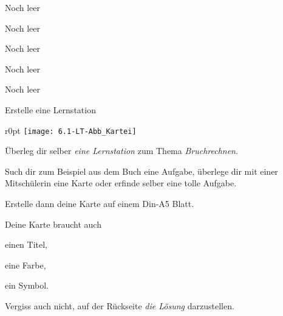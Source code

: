 \documentclass[12pt,a5paper,landscape]{scrartcl}
\begin{document}
	\begin{karte1}{Noch leer}
	\end{karte1}
	
	\begin{karte1}{Noch leer}
	\end{karte1}
	
	\begin{karte1}{Noch leer}
	\end{karte1}
		
	\begin{karte1}{Noch leer}
	\end{karte1}
	
	\begin{karte1}{Noch leer}
	\end{karte1}
	
	\begin{karte3}[\symPartner]{Erstelle eine Lernstation}
		\vspace*{1cm}
		\begin{wrapfigure}{r}{0pt}
			\texttt{[image: 6.1-LT-Abb\_Kartei]}
		\end{wrapfigure}
		Überleg dir selber \emph{eine Lernstation} zum Thema \emph{Bruchrechnen}.
		
		Such dir zum Beispiel aus dem Buch eine Aufgabe, überlege dir mit einer Mitschülerin eine Karte oder erfinde selber eine tolle Aufgabe.
		
		Erstelle dann deine Karte auf einem Din-A5 Blatt.
		
		Deine Karte braucht auch
		\begin{smallitemize}
			\item einen Titel,
			\item eine Farbe,
			\item ein Symbol.
		\end{smallitemize}
		
		Vergiss auch nicht, auf der Rückseite \emph{die Lösung} darzustellen.

	\end{karte3}
	
	\leereKarte
	
\end{document}
